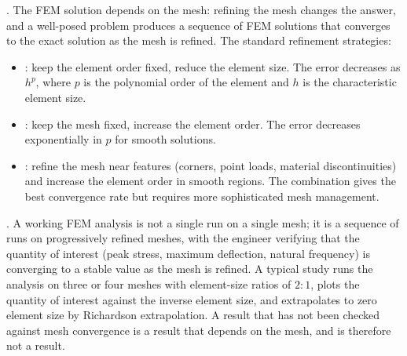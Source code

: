 . The FEM solution depends on the mesh: refining
the mesh changes the answer, and a well-posed problem produces a
sequence of FEM solutions that converges to the exact solution as
the mesh is refined. The standard refinement strategies:

\begin{itemize}[leftmargin=*]
  \item {}: keep the element order fixed, reduce
    the element size. The error decreases as $h^p$, where $p$ is
    the polynomial order of the element and $h$ is the
    characteristic element size.
  \item {}: keep the mesh fixed, increase the
    element order. The error decreases exponentially in $p$ for
    smooth solutions.
  \item {}: refine the mesh near features
    (corners, point loads, material discontinuities) and increase
    the element order in smooth regions. The combination gives the
    best convergence rate but requires more sophisticated mesh
    management.
\end{itemize}

. A working FEM analysis is not a
single run on a single mesh; it is a sequence of runs on progressively
refined meshes, with the engineer verifying that the quantity of
interest (peak stress, maximum deflection, natural frequency) is
converging to a stable value as the mesh is refined. A typical study
runs the analysis on three or four meshes with element-size ratios
of $2:1$, plots the quantity of interest against the inverse element
size, and extrapolates to zero element size by Richardson
extrapolation. A result that has not been checked against mesh
convergence is a result that depends on the mesh, and is therefore
not a result.

